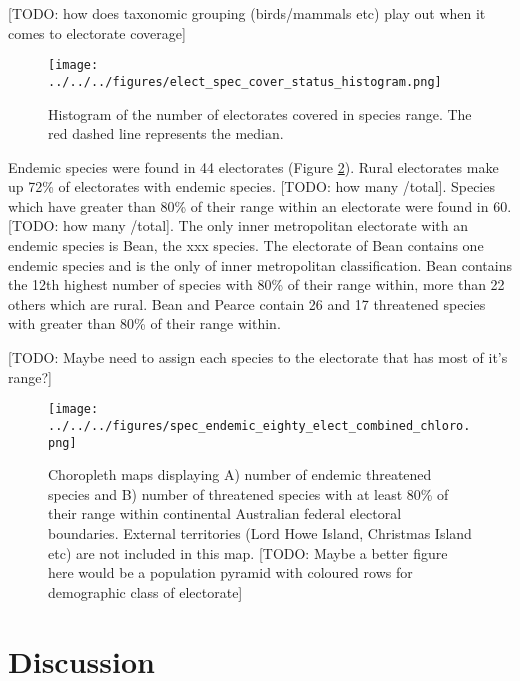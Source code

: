 \documentclass[a4paper,11pt]{article}
\begin{document}
[TODO: how does taxonomic grouping (birds/mammals etc) play out when it comes to electorate coverage]

\begin{figure}[H]
	\centering
    \texttt{[image: ../../../figures/elect\_spec\_cover\_status\_histogram.png]}
    \caption{Histogram of the number of electorates covered in species range. The red dashed line represents the median.}
    \label{fig:hist}
\end{figure}

Endemic species were found in 44 electorates (Figure \ref{fig:combined_chloro}). Rural electorates make up 72\% of electorates with endemic species. [TODO: how many /total].
Species which have greater than 80\% of their range within an electorate were found in 60. [TODO: how many /total].
The only inner metropolitan electorate with an endemic species is Bean, the xxx species.
The electorate of Bean contains one endemic species and is the only of inner metropolitan classification. Bean contains the 12th highest number of species with 80\% of their range within, more than 22 others which are rural. Bean and Pearce contain 26 and 17 threatened species with greater than 80\% of their range within.


[TODO: Maybe need to assign each species to the electorate that has most of it's range?]

\begin{figure}[H]
	\centering
    \texttt{[image: ../../../figures/spec\_endemic\_eighty\_elect\_combined\_chloro.png]}
    \caption{Choropleth maps displaying A) number of endemic threatened species and B) number of threatened species with at least 80\% of their range within continental Australian federal electoral boundaries. External territories (Lord Howe Island, Christmas Island etc) are not included in this map. [TODO: Maybe a better figure here would be a population pyramid with coloured rows for demographic class of electorate]}
    \label{fig:combined_chloro}
\end{figure}

\section{Discussion}
\end{document}
